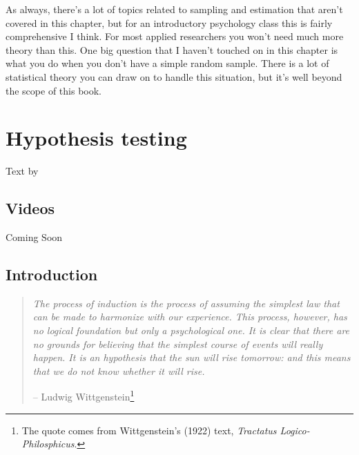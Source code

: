 \documentclass[
]{book}
\begin{document}
As always, there's a lot of topics related to sampling and estimation that aren't covered in this chapter, but for an introductory psychology class this is fairly comprehensive I think. For most applied researchers you won't need much more theory than this. One big question that I haven't touched on in this chapter is what you do when you don't have a simple random sample. There is a lot of statistical theory you can draw on to handle this situation, but it's well beyond the scope of this book.

\hypertarget{hypothesistesting}{%
\chapter{Hypothesis testing}\label{hypothesistesting}}

Text by \citet{Navarro2018}

\hypertarget{videos-3}{%
\section{Videos}\label{videos-3}}

Coming Soon

\hypertarget{introduction-3}{%
\section{Introduction}\label{introduction-3}}

\begin{quote}
\emph{The process of induction is the process of assuming the simplest law that can be made to harmonize with our experience. This process, however, has no logical foundation but only a psychological one. It is clear that there are no grounds for believing that the simplest course of events will really happen. It is an hypothesis that the sun will rise tomorrow: and this means that we do not know whether it will rise.}

-- Ludwig Wittgenstein\footnote{The quote comes from Wittgenstein's (1922) text, \emph{Tractatus Logico-Philosphicus}.}
\end{quote}
\end{document}
